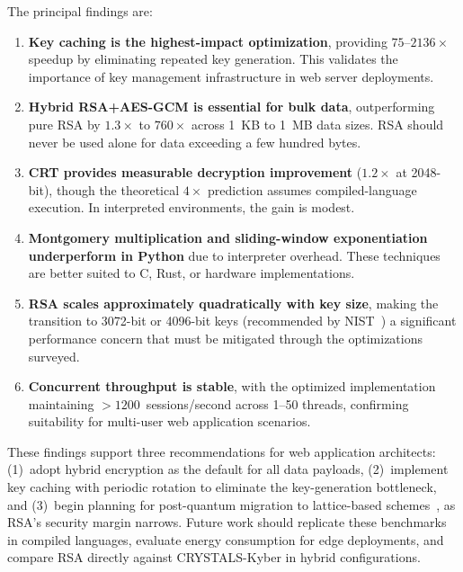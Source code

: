 \documentclass[journal]{IEEEtran}
\begin{document}
The principal findings are:

\begin{enumerate}
    \item \textbf{Key caching is the highest-impact optimization}, providing $75$--$2136\times$ speedup by eliminating repeated key generation. This validates the importance of key management infrastructure in web server deployments.

    \item \textbf{Hybrid RSA+AES-GCM is essential for bulk data}, outperforming pure RSA by $1.3\times$ to $760\times$ across 1~KB to 1~MB data sizes. RSA should never be used alone for data exceeding a few hundred bytes.

    \item \textbf{CRT provides measurable decryption improvement} ($1.2\times$ at 2048-bit), though the theoretical $4\times$ prediction assumes compiled-language execution. In interpreted environments, the gain is modest.

    \item \textbf{Montgomery multiplication and sliding-window exponentiation underperform in Python} due to interpreter overhead. These techniques are better suited to C, Rust, or hardware implementations.

    \item \textbf{RSA scales approximately quadratically with key size}, making the transition to 3072-bit or 4096-bit keys (recommended by NIST~\cite{nist_sp80057}) a significant performance concern that must be mitigated through the optimizations surveyed.

    \item \textbf{Concurrent throughput is stable}, with the optimized implementation maintaining $>1200$~sessions/second across 1--50 threads, confirming suitability for multi-user web application scenarios.
\end{enumerate}

These findings support three recommendations for web application architects: (1)~adopt hybrid encryption as the default for all data payloads, (2)~implement key caching with periodic rotation to eliminate the key-generation bottleneck, and (3)~begin planning for post-quantum migration to lattice-based schemes~\cite{kyber2023}, \cite{dilithium2022} as RSA's security margin narrows. Future work should replicate these benchmarks in compiled languages, evaluate energy consumption for edge deployments, and compare RSA directly against CRYSTALS-Kyber in hybrid configurations.
\end{document}
